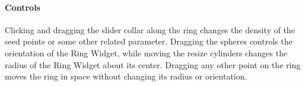 \paragraph{Controls} Clicking and dragging the slider collar along the
ring changes the density of the seed points or some other related
parameter.  Dragging the spheres controls the orientation of the Ring
Widget, while moving the resize cylinders changes the radius of the Ring
Widget about its center.  Dragging any other point on the ring moves the
ring in space without changing its radius or orientation.


